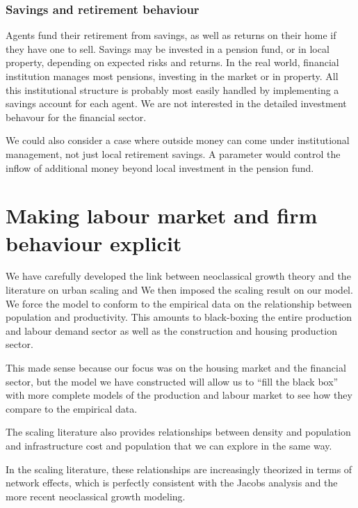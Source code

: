 \subsubsection{Savings and retirement behaviour}
Agents fund their retirement from savings, as well as returns on their home if they have one to sell. Savings may be invested in a pension fund, or in local property,  depending on expected risks and returns. In the real world, financial institution manages most pensions, investing in the market or in property.  All this institutional structure is probably most easily handled by implementing a savings account for each agent. We are not interested in the detailed investment behavour for the financial sector.%


We could also consider a case where outside money can come under institutional management, not just local retirement savings. A parameter would control the inflow of additional money beyond local investment in the pension fund. 



\section{Making  labour market and firm behaviour explicit }
We have carefully developed the link between neoclassical growth theory and the literature on urban scaling \cite{bettencourtIntroductionUrbanScience2021} and  We then imposed the scaling result on our model.  We force the model to conform to the empirical data on the relationship between population and productivity. This amounts to black-boxing the entire production and labour demand sector as well as the construction and housing production sector. 

This made sense because our focus  was on the housing market and the financial sector, but the model we have constructed will allow us to ``fill the black box'' with more complete models of the production and labour market to see how they compare to the empirical data. 

The  scaling  literature also provides relationships between density and population and infrastructure cost and population that we can explore in the same way.

In the scaling literature, these relationships are increasingly theorized in terms of network effects, which is perfectly consistent with the Jacobs analysis and the more recent neoclassical growth modeling.


